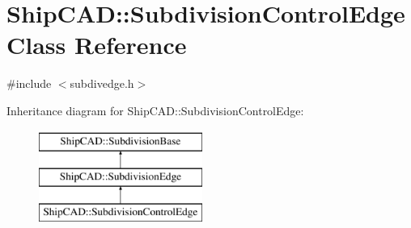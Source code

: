 \hypertarget{classShipCAD_1_1SubdivisionControlEdge}{\section{Ship\-C\-A\-D\-:\-:Subdivision\-Control\-Edge Class Reference}
\label{classShipCAD_1_1SubdivisionControlEdge}
}


{\ttfamily \#include $<$subdivedge.\-h$>$}

Inheritance diagram for Ship\-C\-A\-D\-:\-:Subdivision\-Control\-Edge\-:\begin{figure}[H]
\begin{center}
\leavevmode
\includegraphics[height=3.000000cm]{classShipCAD_1_1SubdivisionControlEdge}
\end{center}
\end{figure}
